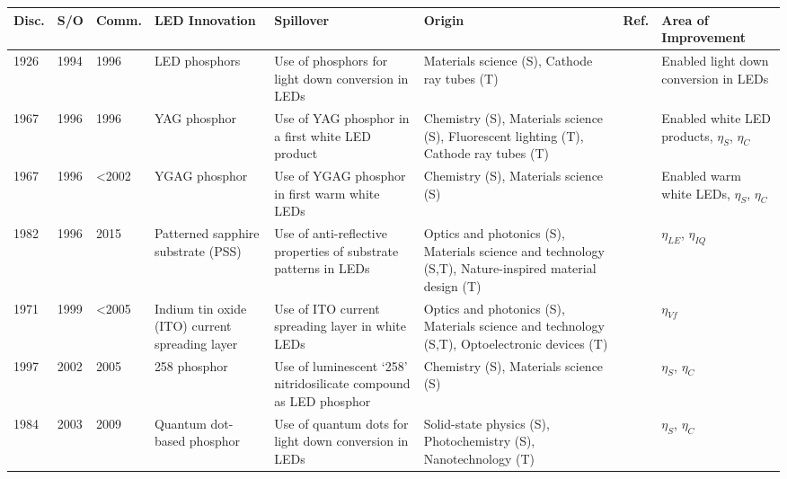 \documentclass[twoside,twocolumn,9pt]{article}
\begin{document}
\begin{table}[h]
    \small
    \centering
    \begin{tabularx}{\textwidth}{|l|l|l|X|X|X|l|X|}
    \hline
        \textbf{Disc.} & \textbf{S/O} & \textbf{Comm.} & \textbf{LED Innovation} & \textbf{Spillover} & \textbf{Origin} & \textbf{Ref.} & \textbf{Area of Improvement} \\ \hline
        1926 & 1994 & 1996 & LED phosphors & Use of phosphors for light down conversion in LEDs & Materials science (S), Cathode ray tubes (T) & \cite{bright1972electric}\cite{shimizu1994sheet}\cite{cho2017white} & Enabled light down conversion in LEDs \\ \hline
        1967 & 1996 & 1996 & YAG phosphor & Use of YAG phosphor in a first white LED product & Chemistry (S), Materials science (S), Fluorescent lighting (T), Cathode ray tubes (T) & \cite{blasse1967new}\cite{bando1996}\cite{bando1998development}\cite{shimizu1999light}\cite{cho2017white} & Enabled white LED products, $\eta_S$, $\eta_C$ \\ \hline
        1967 & 1996 & <2002 & YGAG phosphor & Use of YGAG phosphor in first warm white LEDs & Chemistry (S), Materials science (S) &\cite{holloway1969optical}\cite{bando1998development}\cite{shimizu1999light}\cite{Mueller2002} & Enabled warm white LEDs, $\eta_S$, $\eta_C$ \\ \hline
        1982 & 1996 & 2015 & Patterned sapphire substrate (PSS) & Use of anti-reflective properties of substrate patterns in LEDs & Optics and photonics (S), Materials science and technology (S,T), Nature-inspired material design (T) &\cite{moharam1982diffraction}\cite{krames1998ordered} & $\eta_{LE}$, $\eta_{IQ}$ \\ \hline
        1971 & 1999 & <2005 & Indium tin oxide (ITO) current spreading layer & Use of ITO current spreading layer in white LEDs & Optics and photonics (S), Materials science and technology (S,T), Optoelectronic devices (T) &\cite{margalith1999indium} & $\eta_{Vf}$ \\ \hline
        1997 & 2002 & 2005 & 258 phosphor & Use of luminescent ‘258’ nitridosilicate compound as LED phosphor & Chemistry (S), Materials science (S) &\cite{Huppertz1997}\cite{mueller2004phosphor}\cite{MuellerMach2005} & $\eta_S$, $\eta_C$ \\ \hline
        1984 & 2003 & 2009 & Quantum dot-based phosphor & Use of quantum dots for light down conversion in LEDs & Solid-state physics (S), Photochemistry (S), Nanotechnology (T) &\cite{fojtik1984photo}\cite{simmonsfinal}\cite{ledprof_nexxusqd}\cite{bourzac2013quantum} & $\eta_S$, $\eta_C$ \\ \hline

\end{tabularx}
\end{table}
\end{document}
